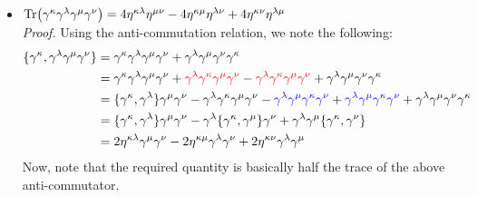 \begin{itemize}
    \textit{Proof.} As $(\gamma^5)^2 = \mathds{1}$, let us multiply $\gamma^5$ to the above expression,
    \begin{align*}
        \gamma^{\mu_1 }\gamma^{\mu_2 }\ldots \gamma^{\mu_{2n+1} } &= \gamma^5\gamma^5\gamma^{\mu_1 }\gamma^{\mu_2 }\ldots \gamma^{\mu_{2n+1} }\\
    \end{align*}
    Shifting one of the $\gamma^5$ to the far right across the $2n+1$ indices will introduce $(-1)^{2n+1}$ and thus, we get:
    $$\gamma^{\mu_1 }\gamma^{\mu_2 }\ldots \gamma^{\mu_{2n+1} } = (-1)^{2n+1}\gamma^5\gamma^{\mu_1 }\gamma^{\mu_2 }\ldots \gamma^{\mu_{2n+1} }\gamma^5$$
    Taking trace both sides and taking the cyclic property of the trace, we obtain the following. Thus, the product of odd number of gamma matrices is zero. 
    \item $\Tr(\gamma^\kappa \gamma^\lambda \gamma^\mu \gamma^\nu) = 4\eta^{\kappa\lambda}\eta^{\mu\nu}-4\eta^{\kappa\mu}\eta^{\lambda\nu}+4\eta^{\kappa\nu}\eta^{\lambda\mu}$\\[0.25cm]
    \textit{Proof.} Using the anti-commutation relation, we note the following: 
    \begin{align*}
        \{\gamma^\kappa, \gamma^\lambda\gamma^\mu\gamma^\nu\} &= \gamma^\kappa\gamma^\lambda\gamma^\mu\gamma^\nu +\gamma^\lambda\gamma^\mu\gamma^\nu\gamma^\kappa \\
        &=\gamma^\kappa\gamma^\lambda\gamma^\mu\gamma^\nu  + \mathcolor{red}{\gamma^{\lambda}\gamma^{\kappa}\gamma^{\mu}\gamma^{\nu}}-\mathcolor{red}{\gamma^{\lambda}\gamma^{\kappa}\gamma^{\mu}\gamma^{\nu}}+ \gamma^\lambda\gamma^\mu\gamma^\nu\gamma^\kappa \\
        &=\{\gamma^\kappa, \gamma^\lambda\}\gamma^\mu\gamma^\nu - \gamma^{\lambda}\gamma^{\kappa}\gamma^{\mu}\gamma^{\nu} -\mathcolor{blue}{\gamma^{\lambda}\gamma^{\mu}\gamma^{\kappa}\gamma^{\nu}} +\mathcolor{blue}{\gamma^{\lambda}\gamma^{\mu}\gamma^{\kappa}\gamma^{\nu}} + \gamma^\lambda\gamma^\mu\gamma^\nu\gamma^\kappa \\
        &=\{\gamma^\kappa, \gamma^\lambda\}\gamma^\mu\gamma^\nu - \gamma^\lambda\{\gamma^\kappa, \gamma^\mu\}\gamma^\nu +\gamma^\lambda\gamma^\mu\{\gamma^\kappa,\gamma^\nu\}\\
        &=2\eta^{\kappa\lambda}\gamma^\mu\gamma^\nu - 2\eta^{\kappa\mu}\gamma^\lambda\gamma^\nu +2\eta^{\kappa\nu}\gamma^\lambda\gamma^\mu
    \end{align*}
    Now, note that the required quantity is basically half the trace of the above anti-commutator.

\end{itemize}
